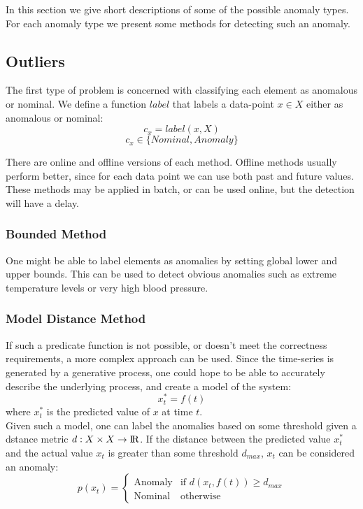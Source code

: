 \documentclass[a4paper, 10pt]{article}
\begin{document}
In this section we give short descriptions of some of the possible anomaly types. For each anomaly type we present some methods for detecting such an anomaly.

\subsection{Outliers}

The first type of problem is concerned with classifying each element as anomalous or nominal. We define a function $label$ that labels a data-point $x \in X$ either as anomalous or nominal:
$$c_x = label(x,X)$$
$$c_x \in \{Nominal, Anomaly\}$$

There are online and offline versions of each method. Offline methods usually perform better, since for each data point we can use both past and future values. These methods may be applied in batch, or can be used online, but the detection will have a delay.

\subsubsection{Bounded Method}

One might be able to label elements as anomalies by setting global lower and upper bounds. This can be used to detect obvious anomalies such as extreme temperature levels or very high blood pressure.

\subsubsection{Model Distance Method}

If such a predicate function is not possible, or doesn't meet the correctness requirements, a more complex approach can be used. Since the time-series is generated by a generative process, one could hope to be able to accurately describe the underlying process, and create a model of the system:
$$x_t^* = f(t)$$
where $x_t^*$ is the predicted value of $x$ at time $t$. \\

Given such a model, one can label the anomalies based on some threshold given a dstance metric $d: X \times X \rightarrow {\rm I\!R}$. If the distance between the predicted value $x_t^*$ and the actual value $x_t$ is greater than some threshold $d_{max}$, $x_t$ can be considered an anomaly:
$$
    p(x_t) =
        \begin{cases}
            \text{Anomaly} & \text{if } d(x_t, f(t)) \ge d_{max} \\
            \text{Nominal} & \text{otherwise}
        \end{cases}
$$
\end{document}
